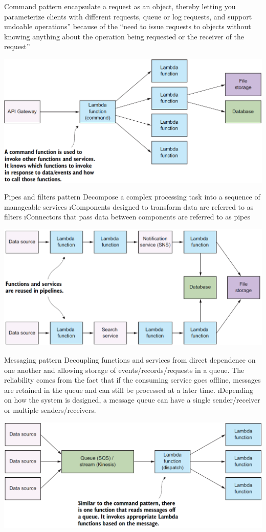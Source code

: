 \begin{frame}{Command pattern}
encapsulate a request as an object, thereby letting you parameterize clients with different requests, queue or log requests, and support undoable operations” because of the “need to issue requests to objects without knowing anything about the operation being requested or the receiver of the request”

\includegraphics[scale=.4]{imgs/pattern_command.PNG}
\end{frame}

\begin{frame}[allowframebreaks]{Pipes and filters pattern}
Decompose a complex processing task into a sequence of manageable services
\i Components designed to transform data are referred to as filters
\i Connectors that pass data between components are referred to as pipes

\includegraphics[width=.7\linewidth]{imgs/pattern_pipeline.PNG}
\end{frame}

\begin{frame}{Messaging pattern}
Decoupling functions and services from direct dependence on one another and allowing storage of events/records/requests in a queue. The reliability comes from the fact that if the consuming service goes offline, messages are retained in the queue and can still be processed at a later time.
\i Depending on how the system is designed, a message queue can have a single
sender/receiver or multiple senders/receivers.

\includegraphics[scale=.4]{imgs/pattern_messaging.PNG}
\end{frame}

